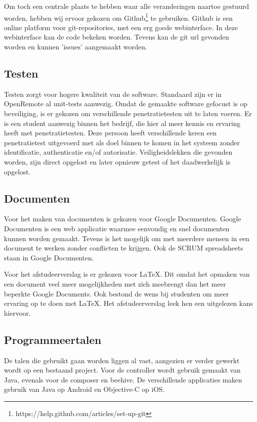 \documentclass[]{article}
\begin{document}
Om toch een centrale plaats te hebben waar alle veranderingen naartoe
gestuurd worden, hebben wij ervoor gekozen om
Github\footnote{https://help.github.com/articles/set-up-git} te gebruiken. Github
is een online platform voor git-repositories, met een erg goede
webinterface. In deze webinterface kan de code bekeken worden. Tevens kan de git url
gevonden worden en kunnen 'issues' aangemaakt worden.

\subsection{Testen}
Testen zorgt voor hogere kwaliteit van de
software. Standaard zijn er in OpenRemote al unit-tests aanwezig. Omdat de
gemaakte software gefocust is op beveiliging, is er gekozen om verschillende
penetratietesten uit te laten voeren. Er is een student aanwezig binnen het bedrijf, die hier al meer
kennis en ervaring heeft met penetratietesten. Deze persoon heeft verschillende keren een
penetratietest uitgevoerd met als doel binnen te komen in het systeem zonder
identificatie, authenticatie en/of autorisatie. Veiligheidslekken die gevonden
worden, zijn direct opgelost en later opnieuw getest of het daadwerkelijk is
opgelost.

\subsection{Documenten}
Voor het maken van documenten is gekozen voor Google Documenten.
Google Documenten is een web applicatie waarmee eenvoudig en
snel documenten kunnen worden gemaakt. Tevens is het mogelijk om met
meerdere mensen in een document te werken zonder conflicten te krijgen. Ook
de SCRUM spreadsheets staan in Google Documenten.

Voor het afstudeerverslag is er gekozen voor \LaTeX. Dit omdat het opmaken
van een document veel meer mogelijkheden met zich meebrengt dan het meer
beperkte Google Documents. Ook bestond de wens bij studenten
om meer ervaring op te doen met \LaTeX\space. Het afstudeerverslag leek hen een uitgelezen kans hiervoor.

\subsection{Programmeertalen}
De talen die gebruikt gaan worden liggen al vast, aangezien er verder 
gewerkt wordt op een bestaand project. Voor de controller wordt gebruik gemaakt van
Java, evenals voor de composer en beehive. De verschillende applicaties maken gebruik
van Java op Android en Objective-C op iOS.
\end{document}
